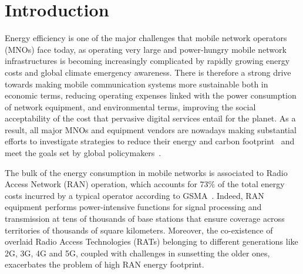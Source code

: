 \vspace{-2pt}
\section{Introduction}
\label{sec:introduction}
\vspace{-4pt}


Energy efficiency is one of the major challenges that mobile network operators (MNOs) face today, as operating very large and power-hungry mobile network infrastructures is becoming increasingly complicated by rapidly growing energy costs and global climate emergency awareness.
There is therefore a strong drive towards making mobile communication systems more sustainable both in economic terms, \ie reducing operating expenses linked with the power consumption of network equipment, and environmental terms, \ie improving the social acceptability of the cost that pervasive digital services entail for the planet.
As a result, all major MNOs and equipment vendors are nowadays making substantial efforts to investigate strategies to reduce their energy and carbon footprint~\cite{huawei_report} and meet the goals set by global policymakers~\cite{gsma20205g, gsm2024mobile}.

The bulk of the energy consumption in mobile networks is associated to Radio Access Network (RAN) operation, which accounts for 73\% of the total energy costs incurred by a typical operator according to GSMA~\cite{green2021going}.
Indeed, RAN equipment performs power-intensive functions for signal processing and transmission at tens of thousands of base stations that ensure coverage across territories of thousands of square kilometers.
Moreover, the co-existence of overlaid Radio Access Technologies (RATs) belonging to different generations like 2G, 3G, 4G and 5G, coupled with challenges in sunsetting the older ones, exacerbates the problem of high RAN energy footprint.

